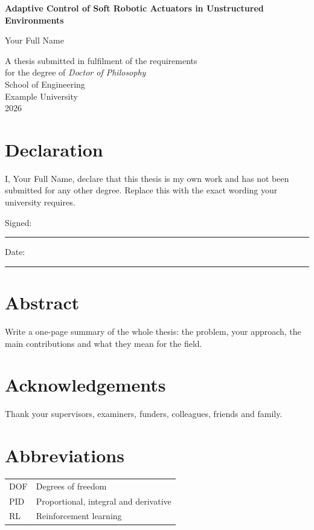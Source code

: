 \documentclass[12pt,a4paper,oneside]{report}
\newcommand{\thesistitle}{Adaptive Control of Soft Robotic Actuators in Unstructured Environments}
\newcommand{\thesisauthor}{Your Full Name}
\newcommand{\thesisdegree}{Doctor of Philosophy}
\newcommand{\thesisdept}{School of Engineering}
\newcommand{\thesisuni}{Example University}
\newcommand{\thesisyear}{2026}
\begin{document}
\begin{titlepage}
  \centering
  \vspace*{2cm}
  {\LARGE\bfseries\thesistitle\par}
  \vspace{2cm}
  {\Large\thesisauthor\par}
  \vfill
  A thesis submitted in fulfilment of the requirements\\
  for the degree of \textit{\thesisdegree}\\[1em]
  \thesisdept\\
  \thesisuni\\[2em]
  \thesisyear
\end{titlepage}

\chapter*{Declaration}
I, \thesisauthor, declare that this thesis is my own work and has not been submitted for any other degree.
Replace this with the exact wording your university requires.

\vspace{2cm}
\noindent Signed: \rule{6cm}{0.4pt}\qquad Date: \rule{3cm}{0.4pt}

\chapter*{Abstract}
Write a one-page summary of the whole thesis: the problem, your approach, the main contributions and what they mean for the field.

\chapter*{Acknowledgements}
Thank your supervisors, examiners, funders, colleagues, friends and family.

\tableofcontents
\cleardoublepage{}
{}
\listoffigures
\cleardoublepage{}
{}
\listoftables

\chapter*{Abbreviations}
\begin{tabular}{@{}ll@{}}
DOF & Degrees of freedom \\
PID & Proportional, integral and derivative \\
RL & Reinforcement learning \\
\end{tabular}
\end{document}
